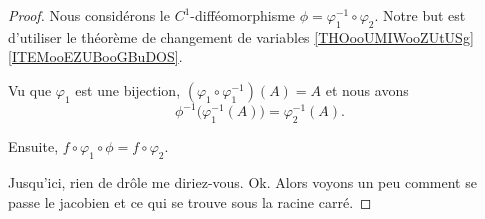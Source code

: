 \begin{proof}
    Nous considérons le \( C^1\)-difféomorphisme \( \phi=\varphi_1^{-1}\circ \varphi_2\). Notre but est d'utiliser le théorème de changement de variables \ref{THOooUMIWooZUtUSg}\ref{ITEMooEZUBooGBuDOS}.
    
    Vu que \( \varphi_1\) est une bijection, \( (\varphi_1\circ\varphi_1^{-1})(A)=A\) et nous avons
    \begin{equation}
        \phi^{-1}\big( \varphi_1^{-1}(A) \big)=\varphi_2^{-1}(A).
    \end{equation}

    Ensuite, \( f\circ\varphi_1\circ\phi=f\circ\varphi_2\).

    Jusqu'ici, rien de drôle me diriez-vous. Ok. Alors voyons un peu comment se passe le jacobien et ce qui se trouve sous la racine carré.


\end{proof}
